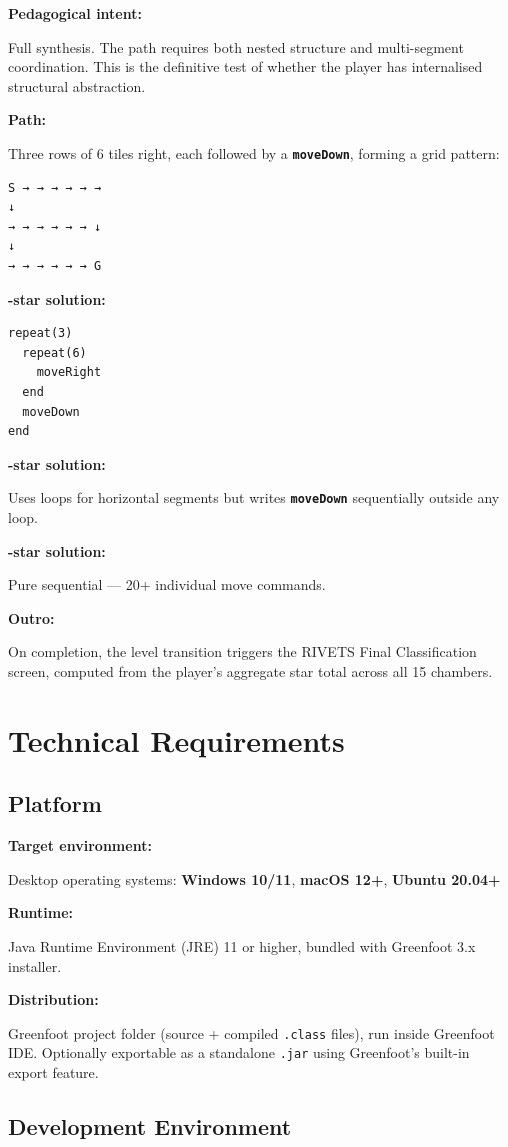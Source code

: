 \documentclass[12pt,a4paper]{article}
\newcommand{\keyword}[1]{\textcolor{keyword}{\texttt{\bfseries #1}}}
\newcommand{\gddfield}[2]{%
  \noindent\begin{minipage}[t]{3.5cm}\bfseries\color{accent}\sffamily#1\end{minipage}%
  \hspace{8pt}%
  \begin{minipage}[t]{\dimexpr\linewidth-3.5cm-8pt\relax}%
    #2
  \end{minipage}\par\smallskip}
\begin{document}
\begin{tcolorbox}[redbox, title={Level 15 — Final Chamber}]
\gddfield{Pedagogical intent:}{Full synthesis. The path requires both nested structure and multi-segment coordination. This is the definitive test of whether the player has internalised structural abstraction.}
\gddfield{Path:}{Three rows of 6 tiles right, each followed by a \keyword{moveDown}, forming a grid pattern:}
\gddfield{}{%
\begin{lstlisting}[language=RobotScript, numbers=none]
S → → → → → →
↓
→ → → → → → ↓
↓
→ → → → → → G
\end{lstlisting}}
\gddfield{3-star solution:}{%
\begin{lstlisting}[language=RobotScript]
repeat(3)
  repeat(6)
    moveRight
  end
  moveDown
end
\end{lstlisting}}
\gddfield{2-star solution:}{Uses loops for horizontal segments but writes \keyword{moveDown} sequentially outside any loop.}
\gddfield{1-star solution:}{Pure sequential — 20+ individual move commands.}
\gddfield{Outro:}{On completion, the level transition triggers the RIVETS Final Classification screen, computed from the player's aggregate star total across all 15 chambers.}
\end{tcolorbox}

\section{Technical Requirements}

\subsection{Platform}

\begin{tcolorbox}[gddbox, title={Platform}]
\gddfield{Target environment:}{Desktop operating systems: \textbf{Windows 10/11}, \textbf{macOS 12+}, \textbf{Ubuntu 20.04+}}
\gddfield{Runtime:}{Java Runtime Environment (JRE) 11 or higher, bundled with Greenfoot 3.x installer.}
\gddfield{Distribution:}{Greenfoot project folder (source + compiled \texttt{.class} files), run inside Greenfoot IDE. Optionally exportable as a standalone \texttt{.jar} using Greenfoot's built-in export feature.}
\end{tcolorbox}

\subsection{Development Environment}
\end{document}
